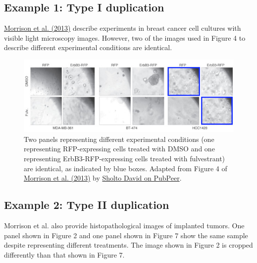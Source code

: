 \documentclass[letterpaper, 12pt]{article}
\begin{document}
\subsection*{Example 1: Type I duplication}

\href{https://doi.org/10.1172/JCI66764}{Morrison et al. (2013)} describe experiments in breast cancer cell cultures with visible light microscopy images. However, two of the images used in Figure 4 to describe different experimental conditions are identical.

\begin{figure}[h!tbp]
    \centering
    \includegraphics[width=\textwidth]{img/image_duplication/image-1744937326665.jpg}
    \caption*{Two panels representing different experimental conditions (one representing RFP-expressing cells treated with DMSO and one representing ErbB3-RFP-expressing cells treated with fulvestrant) are identical, as indicated by blue boxes. Adapted from Figure 4 of \href{https://doi.org/10.1172/JCI66764}{Morrison et al. (2013)} by \href{https://pubpeer.com/publications/2768B5B42E7338AB72D4CFE660596A\#1}{Sholto David on PubPeer}.}
\end{figure}

\pagebreak

\subsection*{Example 2: Type II duplication}

Morrison et al. also provide histopathological images of implanted tumors. One panel shown in Figure 2 and one panel shown in Figure 7 show the same sample despite representing different treatments. The image shown in Figure 2 is cropped differently than that shown in Figure 7.
\end{document}
